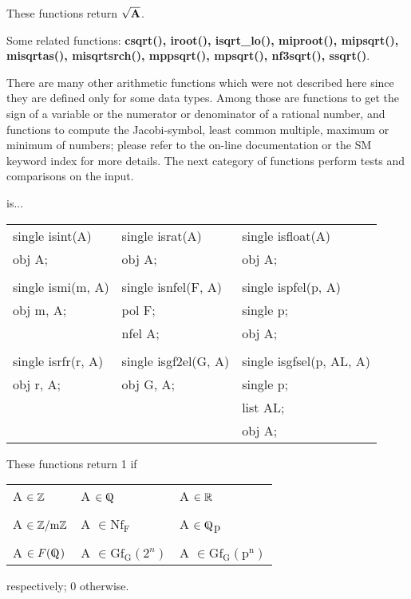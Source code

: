 These functions return $\sqrt{\mbox{\bf A}}$.

Some related functions:\hspace*{0.7em}
{\bf csqrt(), iroot(), isqrt\_lo(), miproot(), mipsqrt(), \\
misqrtas(), misqrtsrch(), mppsqrt(), mpsqrt(), nf3sqrt(), ssqrt()}.

\leer\leer
There are many other arithmetic functions which were not described here
since they are defined only for some data types. Among those are functions
to get the sign of a variable or the numerator or denominator of a rational
number, and functions to compute the Jacobi-symbol, least common multiple,
maximum or minimum of numbers; please refer to the on-line documentation
or the SM keyword index 
for more details. The next category of functions perform tests and comparisons
on the input.

\newpage

\leer\leer
\begin{center} is... \end{center}
\begin{center}
{\bf
\begin{tabular}{lll}
single isint(A) & single israt(A) & single isfloat(A)\\
obj A;          & obj A;          & obj A;\\
&&\\
single ismi(m, A) & single isnfel(F, A) & single ispfel(p, A)\\
obj m, A;         & pol F;              & single p;\\
                  & nfel A;             & obj A;\\
&&\\
single isrfr(r, A) & single isgf2el(G, A) & single isgfsel(p, AL, A)\\
obj r, A;          & obj G, A;            & single p;\\
                   &                      & list AL;\\
                   &                      & obj A;\\[1.5ex]
\end{tabular} }
\end{center}

These functions return 1 if
\begin{center}
{\bf
\begin{tabular}{lll}
A $\in \mbox{$\mathbb Z$}$ & A $\in \Qfett$ & A $\in \mbox{$\mathbb R$}$\\
&&\\
A $\in \mbox{$\mathbb Z$}/\mbox{m}\mbox{$\mathbb Z$}$ & A $\in \mbox{Nf}_{\mbox{F}}$ & A $\in \Qfett_{\mbox{p}}$\\
&&\\
A $\in F(\Qfett)$ & A $\in \mbox{Gf}_{\mbox{G}}(2^n)$ & A $\in \mbox{Gf}_{\mbox{G}}(\mbox{p}^{\mbox{n}})$\\[1.5ex]
\end{tabular} }
\end{center}
respectively; 0 otherwise.

